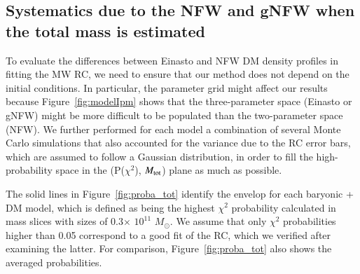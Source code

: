 \documentclass{aa}
\begin{document}

\subsection{Systematics due to the NFW and gNFW when the total mass is estimated}
To evaluate the differences between Einasto and NFW DM density profiles in fitting the MW RC, we need to ensure that our method does not depend on the initial conditions. In particular, the parameter grid might affect our results because Figure~\ref{fig:modelIpm} shows that the three-parameter space (Einasto or gNFW) might be more difficult to be populated than the two-parameter space (NFW). We further performed for each model a combination of several Monte Carlo simulations that also accounted for the variance due to the RC error bars, which are assumed to follow a Gaussian distribution, in order to fill the high-probability space in the (P($\chi^2$), $M_{\rm tot}$) plane as much as possible.

 The solid lines in Figure~\ref{fig:proba_tot} identify the envelop for each baryonic + DM model, which is defined as being the highest $\chi^2$ probability calculated in mass slices with sizes of 0.3$\times$ $10^{11}$ $M_{\odot}$. We assume that only $\chi^2$ probabilities higher than 0.05 correspond to a good fit of the RC, which we verified after examining the latter. For comparison, Figure~\ref{fig:proba_tot} also shows the averaged probabilities.

\end{document}
